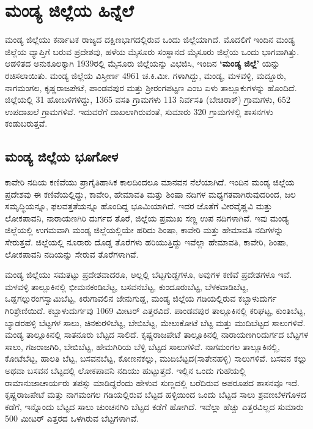 
\chapter{ಮಂಡ್ಯ ಜಿಲ್ಲೆಯ ಹಿನ್ನೆಲೆ}

 ಮಂಡ್ಯ ಜಿಲ್ಲೆಯು ಕರ್ನಾಟಕ ರಾಜ್ಯದ ದಕ್ಷಿಣಭಾಗದಲ್ಲಿರುವ ಒಂದು ಜಿಲ್ಲೆಯಾಗಿದೆ. ಮೊದಲಿಗೆ ಇಂದಿನ ಮಂಡ್ಯ ಜಿಲ್ಲೆಯ ವ್ಯಾಪ್ತಿಗೆ ಬರುವ ಪ್ರದೇಶವು, ಹಳೆಯ ಮೈಸೂರು ಸಂಸ್ಥಾನದ ಮೈಸೂರು ಜಿಲ್ಲೆಯ ಒಂದು ಭಾಗವಾಗಿತ್ತು. ಆಡಳಿತದ ಅನುಕೂಲಕ್ಕಾಗಿ 1939ರಲ್ಲಿ ಮೈಸೂರು ಜಿಲ್ಲೆಯನ್ನು ವಿಭಜಿಸಿ, ಇಂದಿನ \textbf{‘ಮಂಡ್ಯ ಜಿಲ್ಲೆ’ }ಯನ್ನು ರಚಿಸಲಾಯಿತು. ಮಂಡ್ಯ ಜಿಲ್ಲೆಯ ವಿಸ್ತೀರ್ಣ 4961 ಚ.ಕಿ.ಮೀ. ಗಳಾಗಿದ್ದು, ಮಂಡ್ಯ, ಮಳವಳ್ಳಿ, ಮದ್ದೂರು, ನಾಗಮಂಗಲ, ಕೃಷ್ಣರಾಜಪೇಟೆ, ಪಾಂಡವಪುರ ಮತ್ತು ಶ‍್ರೀರಂಗಪಟ್ಟಣ ಎಂಬ ಏಳು ತಾಲ್ಲೂಕುಗಳನ್ನು ಹೊಂದಿದೆ. ಜಿಲ್ಲೆಯಲ್ಲಿ 31 ಹೋಬಳಿಗಳಿದ್ದು, 1365 ವಸತಿ ಗ್ರಾಮಗಳು 113 ನಿರ್ವಸತಿ (ಬೇಚಿರಾಕ್) ಗ್ರಾಮಗಳು, 652 ಉಪದಾಖಲೆ ಗ್ರಾಮಗಳಿವೆ. ಇದುವರೆಗೆ ದಾಖಲಾಗಿರುವಂತೆ, ಸುಮಾರು 320 ಗ್ರಾಮಗಳಲ್ಲಿ ಶಾಸನಗಳು ಕಂಡುಬರುತ್ತವೆ.

\section{ಮಂಡ್ಯ ಜಿಲ್ಲೆಯ ಭೂಗೋಳ}

ಕಾವೇರಿ ನದಿಯ ಕಣಿವೆಯು ಪ್ರಾಗೈತಿಹಾಸಿಕ ಕಾಲದಿಂದಲೂ ಮಾನವನ ನೆಲೆಯಾಗಿದೆ. ಇಂದಿನ ಮಂಡ್ಯ ಜಿಲ್ಲೆಯ ಪ್ರದೇಶವು ಈ ಕಣಿವೆಯಲ್ಲಿದ್ದು, ಕಾವೇರಿ, ಹೇಮಾವತಿ ಮತ್ತು ಶಿಂಷಾ ನದಿಗಳ ಮಧ್ಯಗತವಾಗಿರುವುದರಿಂದ, ಜಲ ಸಮೃದ್ಧಿಯನ್ನೂ, ಫಲವತ್ತತೆಯನ್ನೂ ಹೊಂದಿದ್ದ ಭೂಮಿಯಾಗಿದೆ. ಇದರ ಜೊತೆಗೆ ವೀರವೈಷ್ಣವಿ ಮತ್ತು ಲೋಕಪಾವನಿ, ನಾರಾಯಣಗಿರಿ ದುರ್ಗದ ತೊರೆ, ಜಿಲ್ಲೆಯ ಪ್ರಮುಖ ಸಣ್ಣ ಉಪ ನದಿಗಳಾಗಿವೆ. ಇವು ಮಂಡ್ಯ ಜಿಲ್ಲೆಯಲ್ಲಿ ಉಗಮವಾಗಿ ಮಂಡ್ಯ ಜಿಲ್ಲೆಯಲ್ಲಿಯೇ ಹರಿದು ಶಿಂಷಾ, ಕಾವೇರಿ ಮತ್ತು ಹೇಮಾವತಿ ನದಿಗಳನ್ನು ಸೇರುತ್ತವೆ. ಜಿಲ್ಲೆಯಲ್ಲಿ ನೂರಾರು ದೊಡ್ಡ ತೊರೆಗಳು ಹರಿಯುತ್ತಿದ್ದು ಇವೆಲ್ಲಾ ಹೇಮಾವತಿ, ಕಾವೇರಿ, ಶಿಂಷಾ, ಲೋಕಪಾವನಿ ನದಿಯನ್ನು ಸೇರುವ ತೊರೆಗಳಾಗಿವೆ.

ಮಂಡ್ಯ ಜಿಲ್ಲೆಯು ಸಮತಟ್ಟು ಪ್ರದೇಶವಾದರೂ, ಅಲ್ಲಲ್ಲಿ ಬೆಟ್ಟಗುಡ್ಡಗಳೂ, ಅವುಗಳ ಕಣಿವೆ ಪ್ರದೇಶಗಳೂ ಇವೆ. ಮಳವಳ್ಳಿ ತಾಲ್ಲೂಕಿನಲ್ಲಿ ಭೀಮನಕಂಡಿಬೆಟ್ಟ, ಬಸವನಬೆಟ್ಟ, ಕುಂದೂರುಬೆಟ್ಟ, ಬೆಳಕವಾಡಿಬೆಟ್ಟ, ಒಡ್ಡಗಲ್ಲುರಂಗಸ್ವಾಮಿಬೆಟ್ಟ, ಕಿರುಗಾವಲಿನ ಜೇನುಗುಡ್ಡ, ಮಂಡ್ಯ ಜಿಲ್ಲೆಯ ಗಡಿಯಲ್ಲಿರುವ ಕಬ್ಬಾಳುದುರ್ಗ ಗಿರಿಶ್ರೇಣಿಯಿದೆ. ಕಬ್ಬಾಳುದುರ್ಗವು 1069 ಮೀಟರ್​ ಎತ್ತರವಿದೆ. ಪಾಂಡವಪುರ ತಾಲ್ಲೂಕಿನಲ್ಲಿ ಕರಿಘಟ್ಟ, ಕುಂತಿಬೆಟ್ಟ, ಬ್ಯಾಡರಹಳ್ಳಿ ಬೆಟ್ಟಗಳ ಸಾಲು, ಚಿನಕುರಳಿಬೆಟ್ಟ, ಬೇಬಿಬೆಟ್ಟ, ಮೇಲುಕೋಟೆ ಬೆಟ್ಟ ಮತ್ತು ಮುದಿಬೆಟ್ಟದ ಸಾಲುಗಳಿವೆ. ಮಂಡ್ಯ ತಾಲ್ಲೂಕಿನಲ್ಲಿ ಸಾತನೂರು ಬೆಟ್ಟದ ಸಾಲಿದೆ. ಕೃಷ್ಣರಾಜಪೇಟೆ ತಾಲ್ಲೂಕಿನಲ್ಲಿ ನಾರಾಯಣಗಿರಿದುರ್ಗದ ಬೆಟ್ಟಗಳ ಸಾಲು, ಗಜರಾಜಗಿರಿ, ಬೇಬಿಬೆಟ್ಟ, ಹೇಮಗಿರಿಯ ಬೆಳ್ಳಿ ಬೆಟ್ಟದ ಸಾಲುಗಳಿವೆ. ನಾಗಮಂಗಲ ತಾಲ್ಲೂಕಿನಲ್ಲಿ, ಕೋಟೆಬೆಟ್ಟ, ಹಾಲತಿ ಬೆಟ್ಟ, ಬಸವನಬೆಟ್ಟ, ಕೋಣನಕಲ್ಲು, ಮುದಿಬೆಟ್ಟದ(ಸಾತೇನಹಳ್ಳಿ) ಸಾಲುಗಳಿವೆ. ಬಸವನ ಕಲ್ಲು ಅಥವಾ ಬಸವನ ಬೆಟ್ಟದಲ್ಲಿ ಲೋಕಪಾವನಿ ನದಿಯು ಹುಟ್ಟುತ್ತದೆ. ಇಲ್ಲಿನ ಒಂದು ಗುಹೆಯಲ್ಲಿ ರಾಮಾನುಜಾಚಾರ್ಯರು ತಪಸ್ಸು ಮಾಡಿದ್ದರೆಂದು ಹೇಳುವ ಸುಣ್ಣದಲ್ಲಿ ಬರೆದಿರುವ ಅಪರೂಪದ ಶಾಸನವೂ ಇದೆ. ಕೃಷ್ಣರಾಜಪೇಟೆ ಮತ್ತು ನಾಗಮಂಗಲ ಗಡಿಯಲ್ಲಿರುವ ಬೆಟ್ಟದ ಹಳ್ಳಿಯಿಂದ ಒಂದು ಬೆಟ್ಟದ ಸಾಲು ಶ್ರವಣಬೆಳಗೊಳದ ಕಡೆಗೆ, ಇನ್ನೊಂದು ಬೆಟ್ಟದ ಸಾಲು ಚುಂಚನಗಿರಿ ಬೆಟ್ಟದ ಕಡೆಗೆ ಹೋಗಿದೆ. ಇವೆಲ್ಲಾ ಹೆಚ್ಚು ಎತ್ತರವಿಲ್ಲದ ಸುಮಾರು 500 ಮೀಟರ್ ಎತ್ತರದ ಒಳಗಿರುವ ಬೆಟ್ಟಗಳಾಗಿವೆ.

